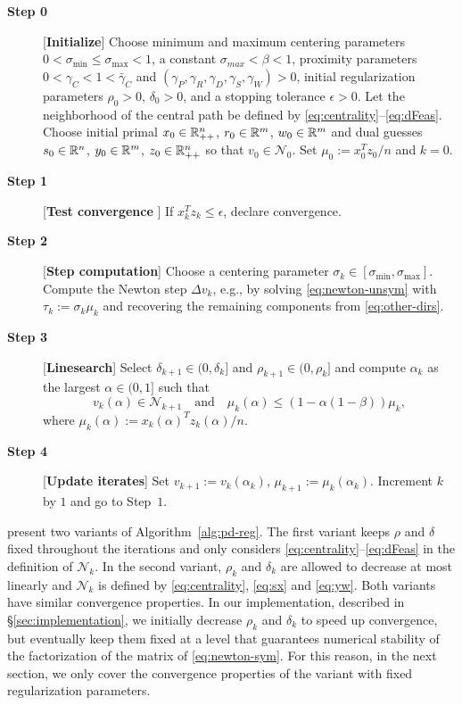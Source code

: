 \documentclass{amsart}
\begin{document}
\begin{algorithm}[htbp]
  \caption{%
    Primal-Dual Regularized Interior-Point Algorithm
    \label{alg:pd-reg}
  }
  \begin{description}
    \item[\textbf{Step 0}] [{\bf Initialize}] Choose minimum and maximum
      centering parameters $0 < \sigma_{\min} \leq \sigma_{\max} < 1$, a
      constant $\sigma_{max} < \beta < 1$, proximity parameters $0 < \gamma_C <
      1 < \bar{\gamma}_C$ and $(\gamma_P,\gamma_R,\gamma_D,\gamma_S,\gamma_W) >
      0$, initial regularization parameters $\rho_0 > 0$, $\delta_0 > 0$, and a
      stopping tolerance $\epsilon > 0$. Let the neighborhood of the central
      path be defined by \eqref{eq:centrality}--\eqref{eq:dFeas}. Choose initial primal $x_0 \in
      \mathbb{R}_{++}^n$, $r_0 \in \mathbb{R}^m$, $w_0 \in \mathbb{R}^m$ and dual guesses $s_0 \in
      \mathbb{R}^n$, $y_0 \in \mathbb{R}^m$,  $z_0 \in \mathbb{R}_{++}^n$ so that $v_0 \in
      \mathcal{N}_0$. Set $\mu_0 := x_0^T z_0 / n$ and $k = 0$.
    \item[\textbf{Step 1}] [{\bf Test convergence }] If
      $x_k^T z_k \leq \epsilon$, declare convergence.
    \item[\textbf{Step 2}] [{\bf  Step  computation}] Choose a centering
      parameter $\sigma_k \in [\sigma_{\min},\sigma_{\max}]$. Compute the Newton
      step $\Delta v_k$, e.g., by solving \eqref{eq:newton-unsym} with
      $\tau_k := \sigma_k \mu_k$ and
      recovering the remaining components from \eqref{eq:other-dirs}.
    \item[\textbf{Step 3}] [{\bf  Linesearch}] Select $\delta_{k+1} \in
      (0,\delta_k]$ and $\rho_{k+1} \in (0,\rho_k]$ and compute $\alpha_k$ as
      the largest $\alpha \in (0,1]$ such that
      \[
        v_k(\alpha) \in \mathcal{N}_{k+1}
        \quad \text{and} \quad
        \mu_k(\alpha) \leq (1 - \alpha (1-\beta)) \mu_k,
      \]
      where $\mu_k(\alpha) := x_k(\alpha)^T z_k(\alpha) / n$.
    \item[\textbf{Step 4}] [{\bf Update iterates}] Set
      $v_{k+1} := v_k(\alpha_k)$, $\mu_{k+1} := \mu_k(\alpha_k)$. Increment $k$
      by $1$ and go to Step~$1$.
  \end{description}
\end{algorithm}

\cite{friedlander-orban-2012} present two variants of
Algorithm~\ref{alg:pd-reg}. The first variant keeps $\rho$ and $\delta$ fixed
throughout the iterations and only considers \eqref{eq:centrality}--\eqref{eq:dFeas} in the definition of
$\mathcal{N}_k$. In the second variant, $\rho_k$ and $\delta_k$ are allowed to
decrease at most linearly and $\mathcal{N}_k$ is defined by
\eqref{eq:centrality}, \eqref{eq:sx} and \eqref{eq:yw}. Both variants have
similar convergence properties. In our implementation, described in
\S\ref{sec:implementation}, we initially decrease $\rho_k$ and $\delta_k$ 
to speed up convergence, but eventually keep them fixed at a level that
guarantees numerical stability of the factorization of the  matrix
of \eqref{eq:newton-sym}. For this reason, in the next section, we only cover
the convergence properties of the variant with fixed regularization parameters.
\end{document}
